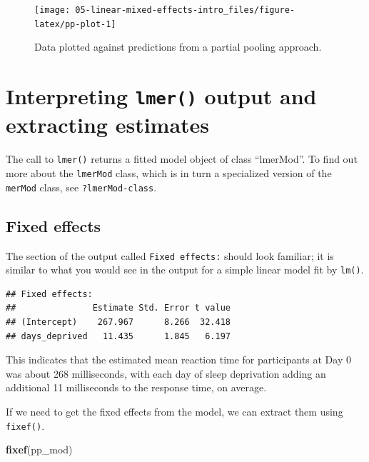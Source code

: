 \documentclass[]{book}
\newenvironment{Shaded}{\begin{snugshade}}{\end{snugshade}}
\newcommand{\KeywordTok}[1]{\textcolor[rgb]{0.13,0.29,0.53}{\textbf{#1}}}
\newcommand{\NormalTok}[1]{#1}
\begin{document}
\begin{figure}

{\centering \texttt{[image: 05-linear-mixed-effects-intro\_files/figure-latex/pp-plot-1]} 

}

\caption{Data plotted against predictions from a partial pooling approach.}\label{fig:pp-plot}
\end{figure}

\hypertarget{interpreting-lmer-output-and-extracting-estimates}{%
\section{\texorpdfstring{Interpreting \texttt{lmer()} output and extracting estimates}{Interpreting lmer() output and extracting estimates}}\label{interpreting-lmer-output-and-extracting-estimates}}

The call to \texttt{lmer()} returns a fitted model object of class ``lmerMod''. To find out more about the \texttt{lmerMod} class, which is in turn a specialized version of the \texttt{merMod} class, see \texttt{?lmerMod-class}.

\hypertarget{fixed-effects}{%
\subsection{Fixed effects}\label{fixed-effects}}

The section of the output called \texttt{Fixed\ effects:} should look familiar; it is similar to what you would see in the output for a simple linear model fit by \texttt{lm()}.

\begin{verbatim}
## Fixed effects:
##               Estimate Std. Error t value
## (Intercept)    267.967      8.266  32.418
## days_deprived   11.435      1.845   6.197
\end{verbatim}

This indicates that the estimated mean reaction time for participants at Day 0 was about
268 milliseconds,
with each day of sleep deprivation adding an additional
11 milliseconds
to the response time, on average.

If we need to get the fixed effects from the model, we can extract them using \texttt{fixef()}.

\begin{Shaded}
\begin{Highlighting}[]
\KeywordTok{fixef}\NormalTok{(pp_mod)}
\end{Highlighting}
\end{Shaded}
\end{document}
